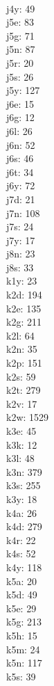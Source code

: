 \begin{multicols}{8}
  \\j4y: 49
  \\j5e: 83
  \\j5g: 71
  \\j5n: 87
  \\j5r: 20
  \\j5s: 26
  \\j5y: 127
  \\j6e: 15
  \\j6g: 12
  \\j6l: 26
  \\j6n: 52
  \\j6s: 46
  \\j6t: 34
  \\j6y: 72
  \\j7d: 21
  \\j7n: 108
  \\j7s: 24
  \\j7y: 17
  \\j8n: 23
  \\j8s: 33
  \\k1y: 23
  \\k2d: 194
  \\k2e: 135
  \\k2g: 211
  \\k2l: 64
  \\k2n: 35
  \\k2p: 151
  \\k2s: 59
  \\k2t: 279
  \\k2v: 17
  \\k2w: 1529
  \\k3e: 45
  \\k3k: 12
  \\k3l: 48
  \\k3n: 379
  \\k3s: 255
  \\k3y: 18
  \\k4a: 26
  \\k4d: 279
  \\k4r: 22
  \\k4s: 52
  \\k4y: 118
  \\k5a: 20
  \\k5d: 49
  \\k5e: 29
  \\k5g: 213
  \\k5h: 15
  \\k5m: 24
  \\k5n: 117
  \\k5s: 39

\end{multicols}
